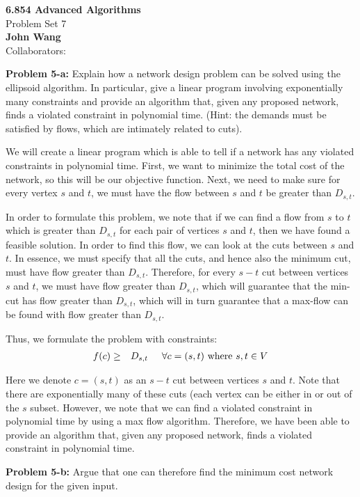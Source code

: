 \documentclass[psamsfonts]{amsart}
\newenvironment{sol}{\vspace{0.25cm}{\large \bfseries Solution:}}{\qedsymbol}
\newenvironment{prob}[1]{\begin{framed}{\large \bfseries Problem #1:}}{\end{framed}}
\newcommand{\makenewtitle}{
    \begin{center}
    {\huge \bfseries 6.854 Advanced Algorithms} \\
    Problem Set 7\\
    \vspace{0.25cm}
    {\bfseries John Wang} \\
    Collaborators: 
    \end{center}
    \vspace{0.5cm}
}
\begin{document}
\newpage
\makenewtitle

\begin{prob}{5-a}
Explain how a network design problem can be solved using the ellipsoid algorithm. In particular, give a linear program involving exponentially many constraints and provide an algorithm that, given any proposed network, finds a violated constraint in polynomial time. (Hint: the demands must be satisfied by flows, which are intimately related to cuts).
\end{prob}
\begin{sol}
We will create a linear program which is able to tell if a network has any violated constraints in polynomial time. First, we want to minimize the total cost of the network, so this will be our objective function. Next, we need to make sure for every vertex $s$ and $t$, we must have the flow between $s$ and $t$ be greater than $D_{s,t}$. 

In order to formulate this problem, we note that if we can find a flow from $s$ to $t$ which is greater than $D_{s,t}$ for each pair of vertices $s$ and $t$, then we have found a feasible solution. In order to find this flow, we can look at the cuts between $s$ and $t$. In essence, we must specify that all the cuts, and hence also the minimum cut, must have flow greater than $D_{s,t}$. Therefore, for every $s-t$ cut between vertices $s$ and $t$, we must have flow greater than $D_{s,t}$, which will guarantee that the min-cut has flow greater than $D_{s,t}$, which will in turn guarantee that a max-flow can be found with flow greater than $D_{s,t}$. 

Thus, we formulate the problem with constraints:
\begin{eqnarray}
f(c) &\geq& D_{s,t} \hspace{0.5cm} \forall c=(s,t) \text{ where } s,t \in V
\end{eqnarray}

Here we denote $c=(s,t)$ as an $s-t$ cut between vertices $s$ and $t$. Note that there are exponentially many of these cuts (each vertex can be either in or out of the $s$ subset. However, we note that we can find a violated constraint in polynomial time by using a max flow algorithm. Therefore, we have been able to provide an algorithm that, given any proposed network, finds a violated constraint in polynomial time. 
\end{sol}

\begin{prob}{5-b}
Argue that one can therefore find the minimum cost network design for the given input. 
\end{prob}
\begin{sol}

\end{sol}
\end{document}
